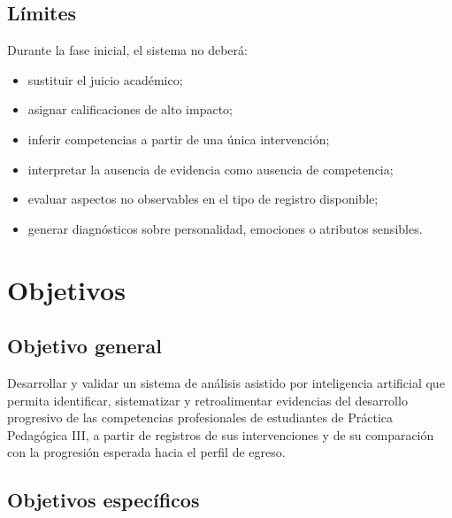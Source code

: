\documentclass[11pt,a4paper]{article}
\begin{document}
\subsection{Límites}

Durante la fase inicial, el sistema no deberá:

\begin{itemize}
    \item sustituir el juicio académico;
    \item asignar calificaciones de alto impacto;
    \item inferir competencias a partir de una única intervención;
    \item interpretar la ausencia de evidencia como ausencia de competencia;
    \item evaluar aspectos no observables en el tipo de registro disponible;
    \item generar diagnósticos sobre personalidad, emociones o atributos sensibles.
\end{itemize}

\section{Objetivos}

\subsection{Objetivo general}

Desarrollar y validar un sistema de análisis asistido por inteligencia artificial que permita identificar, sistematizar y retroalimentar evidencias del desarrollo progresivo de las competencias profesionales de estudiantes de Práctica Pedagógica III, a partir de registros de sus intervenciones y de su comparación con la progresión esperada hacia el perfil de egreso.

\subsection{Objetivos específicos}
\end{document}
